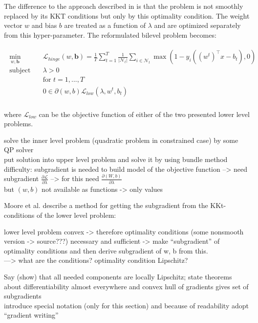 The difference to the approach described in \cite{Kunapuli2008} is that the problem is not smoothly replaced by its KKT conditions but only by this optimality condition. The weight vector \(w\) and bias \(b\) are treated as a function of \(\lambda\) and are optimized separately from this hyper-parameter.
The reformulated bilevel problem becomes:

\begin{align}
	\begin{split}
	\min_{w,\bm{b}} \quad &  \mathcal{L}_{hinge}(w,\bm{b}) = \frac{1}{T}\sum_{t=1}^T\frac{1}{|\mathcal{N}_t|}\sum_{i \in \mathcal{N}_t}{\max\left(1-y_i((w^t)^{\top}x-b_t),0\right)}\\
	\text{subject to} \quad & \lambda > 0 \\
	& \text{for } t = 1,...,T \\
	& 0 \in \partial(w,b)\mathcal{L}_{low}(\lambda,w^t,b_t) \\
\end{split}
\label{SVM_opt_cond}
\end{align}

where \(\mathcal{L}_{low}\) can be the objective function of either of the two presented lower level problems.



solve the inner level problem (quadratic problem in constrained case) by some QP solver \\
put solution into upper level problem and solve it by using bundle method \\
difficulty: subgradient is needed to build model of the objective function --> need subgradient \(\frac{\partial \mathcal{L}}{\partial \lambda}\) --> for this need \(\frac{\partial (W,b)}{\partial \lambda}\) \\
but \((w,b)\) not available as functions -> only values

Moore et al. \cite{Moore2011} describe a method for getting the subgradient from the KKt-conditions of the lower level problem:

lower level problem convex -> therefore optimality conditions (some nonsmooth version -> source???) necessary and sufficient -> make ``subgradient'' of optimality conditions and then derive subgradient of w, b from this. \\
---> what are the conditions? optimality condition Lipschitz? 

Say (show) that all needed components are locally Lipschitz; state theorems about differentiability almost everywhere and convex hull of gradients gives set of subgradients\\
introduce special notation (only for this section) and because of readability adopt ``gradient writing''

